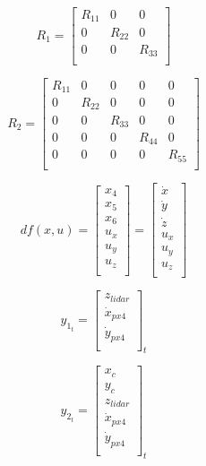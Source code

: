 \documentclass{article}
\begin{document}
\[
	R_1=
	\left[ {\begin{array}{ccc}
				R_{11} & 0 & 0\\
				0 & R_{22} & 0\\
				0 & 0 & R_{33}\\
	\end{array} } \right]
\]

\[
	R_2=
	\left[ {\begin{array}{ccccc}
				R_{11} & 0 & 0 & 0 & 0\\
				0 & R_{22} & 0 & 0 & 0\\
				0 & 0 & R_{33} & 0 & 0\\
				0 & 0 & 0 & R_{44} & 0\\
				0 & 0 & 0 & 0 & R_{55}\\
	\end{array} } \right]
\]



\[
	df(x,u)=
	\left[ {\begin{array}{cccccc}
				x_4\\
				x_5\\
				x_6\\
				u_x\\
				u_y\\
				u_z\\
	\end{array} } \right]
	= 
	\left[ {\begin{array}{cccccc}
				\dot x\\
				\dot y\\
				\dot z\\
				u_x\\
				u_y\\
				u_z\\
	\end{array} } \right]
\]

\[
	y_{1_t}=
	\left[ {\begin{array}{ccc}
				z_{lidar}\\
				\dot x_{px4}\\
				\dot y_{px4}\\
	\end{array} } \right]_t
\]

\[
	y_{2_t}=
	\left[ {\begin{array}{ccccc}
				x_c\\
				y_c\\
				z_{lidar}\\
				\dot x_{px4}\\
				\dot y_{px4}\\
	\end{array} } \right]_t
\]
\end{document}
